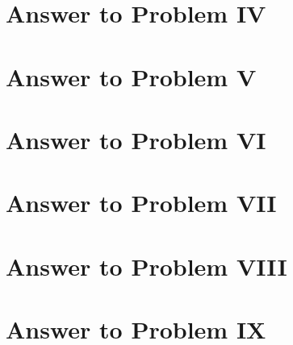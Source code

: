 \documentclass[11pt,a4paper]{article}
\begin{document}
\clearpage

\section{Answer to Problem IV}\label{sec:P04}



\clearpage

\section{Answer to Problem V}\label{sec:P05}



\clearpage

\section{Answer to Problem VI}\label{sec:P06}



\clearpage

\section{Answer to Problem VII}\label{sec:P07}



\clearpage

\section{Answer to Problem VIII}\label{sec:P08}



\clearpage

\section{Answer to Problem IX}\label{sec:P09}



\clearpage
\end{document}
